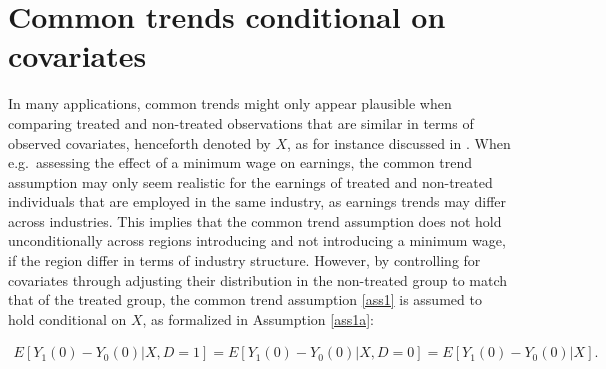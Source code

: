 {	\section{Common trends conditional on covariates}\label{covariates}
		
	In many applications, common trends might only appear plausible when comparing treated and non-treated observations that are similar in terms of observed covariates, henceforth denoted by $X$, as for instance discussed in \citet{Abadie2005}. When e.g.\ assessing the effect of a minimum wage on earnings, the common trend assumption may only seem realistic for the earnings of treated and non-treated individuals that are employed in the same industry, as earnings trends may differ across industries. This implies that the common trend assumption does not hold unconditionally across regions introducing and not introducing a minimum wage, if the region differ in terms of industry structure. However, by controlling for covariates through adjusting their distribution in the non-treated group to match that of the treated group, the common trend assumption \ref{ass1} is assumed to hold conditional on $X$, as formalized in Assumption \ref{ass1a}:
	\begin{assumption}\label{ass1a}
		\begin{eqnarray*}
			E[Y_1(0)-Y_0(0)|X, D=1]=E[Y_1(0)-Y_0(0)|X, D=0]=E[Y_1(0)-Y_0(0)| X].
		\end{eqnarray*}
	\end{assumption}
	
}
